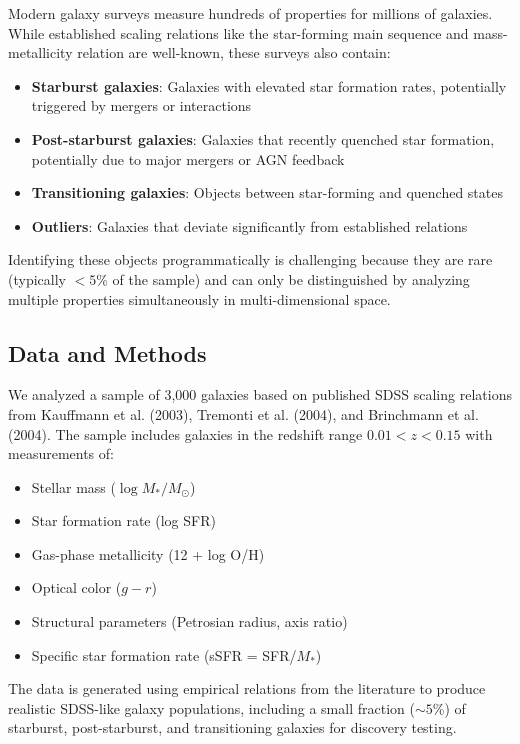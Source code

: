 \documentclass[usenatbib]{rasti}
\begin{document}
Modern galaxy surveys measure hundreds of properties for millions of galaxies. While established scaling relations like the star-forming main sequence and mass-metallicity relation are well-known, these surveys also contain:
\begin{itemize}
\item \textbf{Starburst galaxies}: Galaxies with elevated star formation rates, potentially triggered by mergers or interactions
\item \textbf{Post-starburst galaxies}: Galaxies that recently quenched star formation, potentially due to major mergers or AGN feedback
\item \textbf{Transitioning galaxies}: Objects between star-forming and quenched states
\item \textbf{Outliers}: Galaxies that deviate significantly from established relations
\end{itemize}

Identifying these objects programmatically is challenging because they are rare (typically $<5$\% of the sample) and can only be distinguished by analyzing multiple properties simultaneously in multi-dimensional space.

\subsection{Data and Methods}

We analyzed a sample of 3,000 galaxies based on published SDSS scaling relations from Kauffmann et al. (2003), Tremonti et al. (2004), and Brinchmann et al. (2004). The sample includes galaxies in the redshift range $0.01 < z < 0.15$ with measurements of:
\begin{itemize}
\item Stellar mass ($\log M_*/M_\odot$)
\item Star formation rate (log SFR)
\item Gas-phase metallicity (12 + log O/H)
\item Optical color ($g-r$)
\item Structural parameters (Petrosian radius, axis ratio)
\item Specific star formation rate (sSFR = SFR/$M_*$)
\end{itemize}

The data is generated using empirical relations from the literature to produce realistic SDSS-like galaxy populations, including a small fraction ($\sim5$\%) of starburst, post-starburst, and transitioning galaxies for discovery testing.
\end{document}
